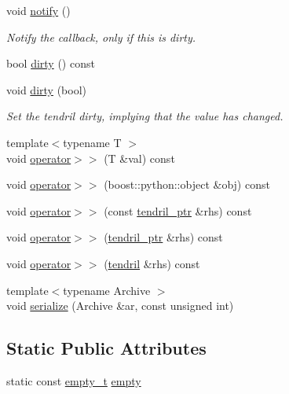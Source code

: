 \begin{DoxyCompactItemize}
\item 
void \hyperlink{classecto_1_1tendril_a87c2df829c12bcd46089d74183c1d8d8}{notify} ()
\begin{DoxyCompactList}\small\item\em Notify the callback, only if this is dirty. \end{DoxyCompactList}\item 
bool \hyperlink{classecto_1_1tendril_aabe2c05389023df143746b5b63b7701e}{dirty} () const 
\item 
void \hyperlink{classecto_1_1tendril_a9c2bb6262190404d3b1648cdcc2960d8}{dirty} (bool)
\begin{DoxyCompactList}\small\item\em Set the tendril dirty, implying that the value has changed. \end{DoxyCompactList}\item 
{\footnotesize template$<$typename T $>$ }\\void \hyperlink{classecto_1_1tendril_a0c843f467b21eee9e5bba8f3f8bc14aa}{operator$>$$>$} (T \&val) const 
\item 
void \hyperlink{classecto_1_1tendril_af019a42fb91908e32db96b84f4a0f978}{operator$>$$>$} (boost\-::python\-::object \&obj) const 
\item 
void \hyperlink{classecto_1_1tendril_aade5aa6d8c439ff515e312f5c9950ec9}{operator$>$$>$} (const \hyperlink{namespaceecto_a84fb5f6130275382e5cbeb5fdececa78}{tendril\-\_\-ptr} \&rhs) const 
\item 
void \hyperlink{classecto_1_1tendril_aaa5858033151487cab9e98e50c79887b}{operator$>$$>$} (\hyperlink{namespaceecto_a84fb5f6130275382e5cbeb5fdececa78}{tendril\-\_\-ptr} \&rhs) const 
\item 
void \hyperlink{classecto_1_1tendril_ad0b2e6eaec37bd46a474ed974ab4272b}{operator$>$$>$} (\hyperlink{classecto_1_1tendril}{tendril} \&rhs) const 
\item 
{\footnotesize template$<$typename Archive $>$ }\\void \hyperlink{classecto_1_1tendril_a697125cfa2b1b53ada4e5e2ee6847181}{serialize} (Archive \&ar, const unsigned int)
\end{DoxyCompactItemize}
\subsection*{Static Public Attributes}
\begin{DoxyCompactItemize}
\item 
static const \hyperlink{structecto_1_1tendril_1_1empty__t}{empty\-\_\-t} \hyperlink{classecto_1_1tendril_ab8098c05197f972a821c8b094b9a6010}{empty}
\end{DoxyCompactItemize}
